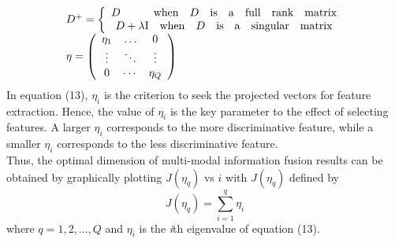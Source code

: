 \documentclass[10pt,journal,compsoc]{IEEEtran}
\begin{document}
\begin{equation}
\begin{array}{l}
 {D^ + } = \left\{ {\begin{array}{*{20}{c}}
   {D\qquad \quad             {\rm{when}}\quad D\quad {\rm{is}}\quad {\rm{a}}\quad {\rm{full}}\quad {\rm{rank}}\quad {\rm{matrix}}}  \\
   {D + \lambda {\rm{I}}\quad {\rm{when}}\quad D\quad {\rm{is}}\quad {\rm{a}}\quad {\rm{singular}}\quad {\rm{matrix}}}  \\
\end{array}} \right. \\
 \eta  = \left( {\begin{array}{*{20}{c}}
   {{\eta _1}} &  \ldots  & 0  \\
    \vdots  &  \ddots  &  \vdots   \\
   0 &  \cdots  & {{\eta _Q}}  \\
\end{array}} \right) \\
 \end{array}
\end{equation}
In equation (13), $\eta_i$  is the criterion to seek the projected vectors for feature extraction. Hence, the value of $\eta_i$ is the key parameter to the effect of selecting features. A larger $\eta_i$ corresponds to the more discriminative feature, while a smaller $\eta_i$ corresponds to the less discriminative feature. \\\indent Thus, the optimal dimension of multi-modal information fusion results can be obtained by graphically plotting $J(\eta_q)$ vs $i$ with $J(\eta_q)$ defined by
\begin{equation}
J(\eta_q) = \sum\limits_{i = 1}^q {{\eta _i}}
\end{equation}
where $ q = 1,2,...,Q$ and ${{\eta _i}}$ is the \textit{i}th eigenvalue of equation (13).
\end{document}
